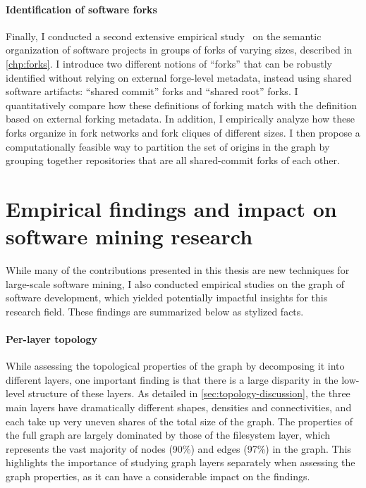 \paragraph*{Identification of software forks}

Finally, I conducted a second extensive empirical
study~\cite{swh-msr2020-forking} on the semantic organization of software
projects in groups of forks of varying sizes, described in \cref{chp:forks}. I
introduce two different notions of ``forks'' that can be robustly identified
without relying on external forge-level metadata, instead using shared software
artifacts: ``shared commit'' forks and ``shared root'' forks. I quantitatively
compare how these definitions of forking match with the definition based on
external forking metadata. In addition, I empirically analyze how these forks
organize in fork networks and fork cliques of different sizes. I then propose a
computationally feasible way to partition the set of origins in the graph by
grouping together repositories that are all shared-commit forks of each other.

\section{Empirical findings and impact on software mining research}

While many of the contributions presented in this thesis are new techniques for
large-scale software mining, I also conducted empirical studies on the graph of
software development, which yielded potentially impactful insights for this
research field. These findings are summarized below as stylized facts.

\paragraph*{Per-layer topology}

While assessing the topological properties of the graph by decomposing it into
different layers, one important finding is that there is a large disparity in
the low-level structure of these layers. As detailed in
\cref{sec:topology-discussion}, the three main layers have dramatically
different shapes, densities and connectivities, and each take up very uneven
shares of the total size of the graph. The properties of the full graph are
largely dominated by those of the filesystem layer, which represents the vast
majority of nodes (90\%) and edges (97\%) in the graph.
This highlights the importance of studying graph layers separately when
assessing the graph properties, as it can have a considerable impact on the
findings.


